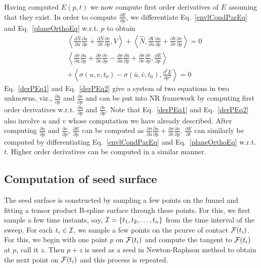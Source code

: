 \documentclass{elsart5p}
\begin{document}
Having computed ${E}(p,t)$ we now compute first order derivatives of ${E}$ assuming that they exist.  In order to compute $\frac{\partial {E}}{\partial p}$, we differentiate Eq.~\ref{envlCondParEq} and Eq.~\ref{planeOrthoEq} w.r.t. $p$ to obtain
\begin{align} 
&\left < \frac{\partial \hat{N}}{\partial u} \frac{\partial u}{\partial p} + \frac{\partial \hat{N}}{\partial v} \frac{\partial v}{\partial p},  V \right > + \left< \hat{N} , \frac{\partial V}{\partial u} \frac{\partial u}{\partial p} + \frac{\partial V}{\partial v} \frac{\partial v}{\partial p} \right >=0  \label{derPEq1}  \\
\nonumber &\left< \frac{\partial \sigma}{\partial u} \frac{\partial u}{\partial p} +  \frac{\partial \sigma}{\partial v} \frac{\partial v}{\partial p} - \frac{\partial \sigma}{\partial u} \frac{\partial \bar{u}}{\partial p} +  \frac{\partial \sigma}{\partial v} \frac{\partial \bar{v}}{\partial p},   \frac{\partial \bar{{E}}}{\partial p}\right> \\
&+ \left < \sigma(u, v ,t_0) - \sigma(\bar{u}, \bar{v}, t_0) , \frac{\partial ^2 \bar{{E}}}{\partial p^2} \right >= 0   \label{derPEq2}
\end{align}
Eq.~\ref{derPEq1} and Eq.~\ref{derPEq2} give a system of two equations in two unknowns, viz., $\frac{\partial u}{\partial p}$ and 
$\frac{\partial v}{\partial p}$ and can be put into NR framework by computing first order derivatives w.r.t. $\frac{\partial u}{\partial p}$ 
and $\frac{\partial v}{\partial p}$.  Note that Eq.~\ref{derPEq1} and Eq.~\ref{derPEq2} also involve $u$ and $v$ whose computation we have already described.
After computing $\frac{\partial u}{\partial p}$ and $\frac{\partial v}{\partial p}$, $\frac{\partial {E}}{\partial p}$ can be computed as 
$\frac{\partial \sigma}{\partial u} \frac{\partial {u}}{\partial p} + \frac{\partial \sigma}{\partial v} \frac{\partial {v}}{\partial p}$.  $\frac{\partial {E}}{\partial t}$ 
can similarly be computed by differentiating Eq.~\ref{envlCondParEq} and Eq.~\ref{planeOrthoEq} w.r.t. $t$.  Higher order derivatives can be computed in a 
similar manner.

\subsection{Computation of seed surface} \label{seedSubSec}

The seed surface is constructed by sampling a few points on the funnel and fitting a tensor 
product B-spline surface through these points.  For this, we first sample a few time instants, 
say, ${\cal I} =\{t_1, t_2, \ldots, t_n \}$ from the time interval of the sweep.  For each $t_i \in {\cal I}$,  
we sample a few points on the pcurve of contact ${\cal F}(t_i)$.  For this, we begin with one point $p$ on ${\cal F}(t_i)$ 
and compute the tangent to ${\cal F}(t_i)$ at $p$, call it $z$. Then $p+z$ 
is used as a seed in Newton-Raphson method to obtain the next point on ${\cal F}(t_i)$ and this process is repeated.
\end{document}
